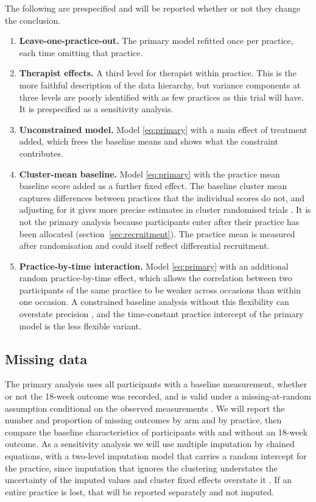 \documentclass[11pt,a4paper]{article}
\begin{document}
The following are prespecified and will be reported whether or not they change
the conclusion.

\begin{enumerate}[leftmargin=1.4em, itemsep=2pt]
\item \textbf{Leave-one-practice-out.} The primary model refitted once per
practice, each time omitting that practice.
\item \textbf{Therapist effects.} A third level for therapist within practice.
This is the more faithful description of the data hierarchy, but variance
components at three levels are poorly identified with as few practices as
this trial will have. It is prespecified as a sensitivity analysis.
\item \textbf{Unconstrained model.} Model \eqref{eq:primary} with a main
effect of treatment added, which frees the baseline means and shows what the
constraint contributes.
\item \textbf{Cluster-mean baseline.} Model \eqref{eq:primary} with the
practice mean baseline score added as a further fixed effect. The baseline
cluster mean captures differences between practices that the individual
scores do not, and adjusting for it gives more precise estimates in cluster
randomised trials \citep{klar2004, hooper2018}. It is not the primary
analysis because participants enter after their practice has been allocated
(section~\ref{sec:recruitment}). The practice mean is measured after
randomisation and could itself reflect differential recruitment.
\item \textbf{Practice-by-time interaction.} Model \eqref{eq:primary} with an
additional random practice-by-time effect, which allows the correlation
between two participants of the same practice to be weaker across occasions
than within one occasion. A constrained baseline analysis without this
flexibility can overstate precision \citep{hooper2016, martin2016,
hooper2018}, and the time-constant practice intercept of the primary model
is the less flexible variant.
\end{enumerate}

\subsection{Missing data}

The primary analysis uses all participants with a baseline measurement,
whether or not the 18-week outcome was recorded, and is valid under a
missing-at-random assumption conditional on the observed measurements
\citep{bell2020}. We will report the number and proportion of
missing outcomes by arm and by practice, then compare the baseline
characteristics of participants with and without an 18-week outcome. As a
sensitivity analysis we will use multiple imputation by chained equations,
with a two-level imputation model that carries a random intercept for the
practice, since imputation that ignores the clustering understates the
uncertainty of the imputed values and cluster fixed effects overstate it
\citep{andridge2011}. If an entire practice is lost, that will be
reported separately and not imputed.
\end{document}
